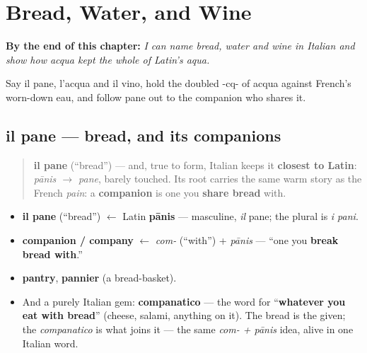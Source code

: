 
\chapter{Bread, Water, and Wine}
\label{ch:it-bread-water-wine}

\begin{chapteropening}
\textbf{By the end of this chapter:} \emph{I can name bread, water and wine in Italian and show how acqua kept the whole of Latin's aqua.}

Say il pane, l'acqua and il vino, hold the doubled -cq- of acqua against French's worn-down eau, and follow pane out to the companion who shares it.
\end{chapteropening}

\section[il pane]{il pane — bread, and its companions}

\label{lesson:IT-C11-pane}



\begin{quote}
\textbf{il pane} (\textquotedblleft{}bread\textquotedblright{}) — and, true to form, Italian keeps it \textbf{closest to Latin}: \emph{pānis $\to$ pane}, barely touched. Its root carries the same warm story as the French \emph{pain}: a \textbf{companion} is one you \textbf{share bread} with.
\end{quote}

\begin{cousinweb}
\begin{itemize}
\raggedright
  \item \textbf{il pane} (\textquotedblleft{}bread\textquotedblright{}) $\leftarrow$ Latin \textbf{pānis} — masculine, \emph{il} pane; the plural is \emph{i pani}.
\end{itemize}
\end{cousinweb}

\begin{cousinweb}
\begin{itemize}
\raggedright
  \item \textbf{companion / company} $\leftarrow$ \emph{com-} (\textquotedblleft{}with\textquotedblright{}) + \emph{pānis} — \textquotedblleft{}one you \textbf{break bread with}.\textquotedblright{}
  \item \textbf{pantry}, \textbf{pannier} (a bread-basket).
  \item And a purely Italian gem: \textbf{companatico} — the word for \textquotedblleft{}\textbf{whatever you eat with bread}\textquotedblright{} (cheese, salami, anything on it). The bread is the given; the \emph{companatico} is what joins it — the same \emph{com- + pānis} idea, alive in one Italian word.
\end{itemize}
\end{cousinweb}

